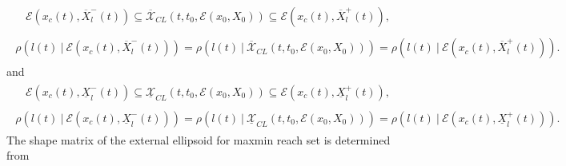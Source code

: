 \documentclass[letterpaper,10pt,english]{sphinxmanual}
\begin{document}
\label{chap_reach:equation-maxmininclusion}\begin{gather}
\begin{split}{\mathcal E}(x_c(t), \overline{X}^-_l(t))\subseteq\overline{{\mathcal X}}_{CL}(t,t_0,{\mathcal E}(x_0,X_0))
\subseteq {\mathcal E}(x_c(t), \overline{X}^+_l(t)),\end{split}\label{chap_reach-maxmininclusion}
\end{gather}\label{chap_reach:equation-maxmintightness}\begin{gather}
\begin{split}\rho(l(t) ~|~ {\mathcal E}(x_c(t), \overline{X}^-_l(t))) =
\rho(l(t) ~|~ \overline{{\mathcal X}}_{CL}(t, t_0, {\mathcal E}(x_0,X_0))) =
\rho(l(t) ~|~ {\mathcal E}(x_c(t), \overline{X}^+_l(t))) .\end{split}\label{chap_reach-maxmintightness}
\end{gather}
and
\label{chap_reach:equation-minmaxinclusion}\begin{gather}
\begin{split}{\mathcal E}(x_c(t), \underline{X}^-_l(t))\subseteq\underline{{\mathcal X}}_{CL}(t,t_0,{\mathcal E}(x_0,X_0))
\subseteq {\mathcal E}(x_c(t), \underline{X}^+_l(t)),\end{split}\label{chap_reach-minmaxinclusion}
\end{gather}\label{chap_reach:equation-minmaxtightness}\begin{gather}
\begin{split}\rho(l(t) ~|~ {\mathcal E}(x_c(t), \underline{X}^-_l(t))) =
\rho(l(t) ~|~ \underline{{\mathcal X}}_{CL}(t, t_0, {\mathcal E}(x_0,X_0))) =
\rho(l(t) ~|~ {\mathcal E}(x_c(t), \underline{X}^+_l(t))) .\end{split}\label{chap_reach-minmaxtightness}
\end{gather}
The shape matrix of the external ellipsoid for maxmin reach set is
determined from
\end{document}
